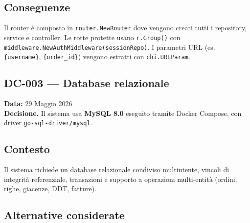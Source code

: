 \documentclass[a4paper,12pt]{article}
\begin{document}

\subsection*{Conseguenze}
Il router \`{e} composto in \texttt{router.NewRouter} dove vengono creati tutti i repository, service e controller. Le rotte protette usano \texttt{r.Group()} con \texttt{middleware.}\allowbreak\texttt{NewAuthMiddleware}\allowbreak\texttt{(sessionRepo)}. I parametri URL (es. \texttt{\{username\}}, \texttt{\{order\_id\}}) vengono estratti con \texttt{chi.URLParam}.

\begin{decisionbox}
\section*{DC-003 --- Database relazionale}
\textbf{Data:} 29 Maggio 2026\\
\textbf{Decisione.} Il sistema usa \textbf{MySQL 8.0} eseguito tramite Docker Compose, con driver \texttt{go-sql-driver/mysql}.
\end{decisionbox}

\subsection*{Contesto}
Il sistema richiede un database relazionale condiviso multiutente, vincoli di integrit\`{a} referenziale, transazioni e supporto a operazioni multi-entit\`{a} (ordini, righe, giacenze, DDT, fatture).


\subsection*{Alternative considerate}
\end{document}
